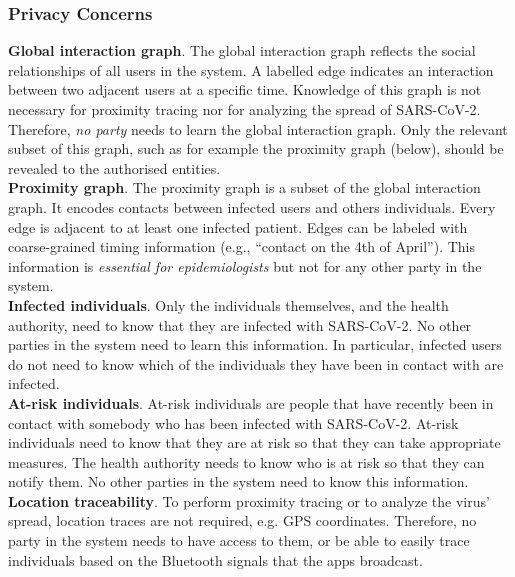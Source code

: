 \documentclass[12pt,a4paper]{article}
\begin{document}
\subsubsection*{Privacy Concerns}
\textbf{Global interaction graph}. The global interaction graph reflects the social relationships of all users in the system. A labelled edge indicates an interaction between two adjacent users at a specific time. Knowledge of this graph is not necessary for proximity tracing nor for analyzing the spread of SARS-CoV-2. Therefore, \textit{no party} needs to learn the global interaction graph. Only the relevant subset of this graph, such as for example the proximity graph (below), should be revealed to the authorised entities.\\[0.3cm]
\textbf{Proximity graph}. The proximity graph is a subset of the global interaction graph. It encodes contacts between infected users and others individuals. Every edge is adjacent to at least one infected patient. Edges can be labeled with coarse-grained timing information (e.g., “contact on the 4th of April”). This information is \textit{essential for epidemiologists} but not for any other party in the system.\\[0.3cm]
\textbf{Infected individuals}. Only the individuals themselves, and the health authority, need to know that they are infected with SARS-CoV-2. No other parties in the system need to learn this information. In particular, infected users do not need to know which of the individuals they have been in contact with are infected.\\[0.3cm]
\textbf{At-risk individuals}. At-risk individuals are people that have recently been in contact with somebody who has been infected with SARS-CoV-2. At-risk individuals need to know that they are at risk so that they can take appropriate measures. The health authority needs to know who is at risk so that they can notify them. No other parties in the system need to know this information.\\[0.3cm]
\textbf{Location traceability}. To perform proximity tracing or to analyze the virus’ spread, location traces are not required, e.g. GPS coordinates. Therefore, no party in the system needs to have access to them, or be able to easily trace individuals based on the Bluetooth signals that the apps broadcast.
\end{document}
